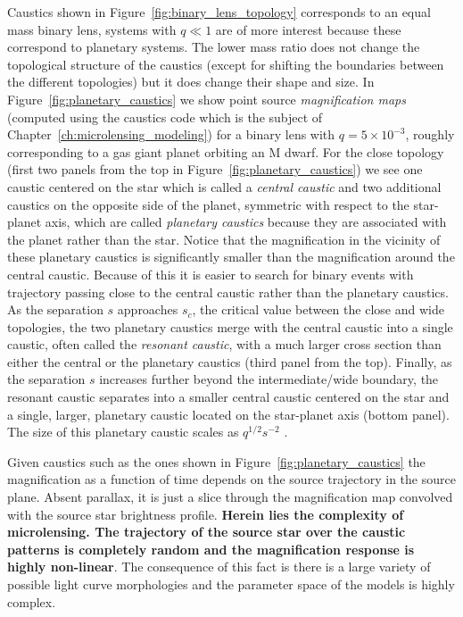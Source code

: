 \documentclass[12pt,dvipsnames]{report}
\newcommand{\ssf}[1]{\textsf{#1}}
\begin{document}
Caustics shown in Figure~\ref{fig:binary_lens_topology} corresponds to an equal
mass binary lens, systems with $q\ll 1$ are of more interest because these
correspond to planetary systems. The lower mass ratio does not change the
topological structure of the caustics (except for shifting the boundaries
between the different topologies) but it does change their shape and size. In
Figure~\ref{fig:planetary_caustics} we show point source \emph{magnification
    maps} (computed using the \ssf{caustics} code which is the subject of
Chapter~\ref{ch:microlensing_modeling}) for a binary lens with $q=5\times
    10^{-3}$, roughly corresponding to a gas giant planet orbiting an M dwarf. For
the close topology (first two panels from the top in
Figure~\ref{fig:planetary_caustics}) we see one caustic centered on the star
which is called a \emph{central caustic} and two additional caustics on the
opposite side of the planet, symmetric with respect to the star-planet axis,
which are called \emph{planetary caustics} because they are associated with the
planet rather than the star. Notice that the magnification in the vicinity of
these planetary caustics is significantly smaller than the magnification around
the central caustic. Because of this it is easier to search for binary events
with trajectory passing close to the central caustic rather than the planetary
caustics. As the separation $s$ approaches $s_c$, the critical value between
the close and wide topologies, the two planetary caustics merge with the
central caustic into a single caustic, often called the \emph{resonant
    caustic}, with a much larger cross section than either the central or the
planetary caustics (third panel from the top). Finally, as the separation $s$
increases further beyond the intermediate/wide boundary, the resonant caustic
separates into a smaller central caustic centered on the star and a single,
larger, planetary caustic located on the star-planet axis (bottom panel). The
size of this planetary caustic scales as $q^{1/2}s^{-2}$ \citep[see references
    in review by][]{Gaudi2012}.

Given caustics such as the ones shown in Figure~\ref{fig:planetary_caustics}
the magnification as a function of time depends on the source trajectory in the
source plane. Absent parallax, it is just a slice through the magnification map
convolved with the source star brightness profile. \textbf{Herein lies the
    complexity of microlensing. The trajectory of the source star over the caustic
    patterns is completely random and the magnification response is highly
    non-linear}. The consequence of this fact is there is a large variety of
possible light curve morphologies and the parameter space of the models is
highly complex.
\end{document}
